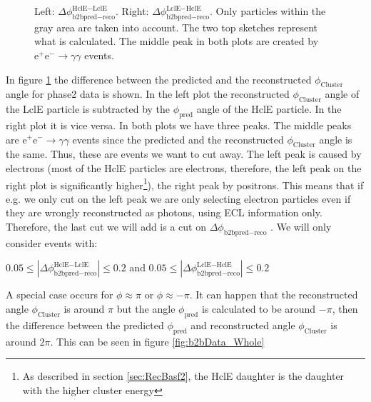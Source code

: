 \documentclass[a4paper,11pt,twosided,final,german,openbib,pdftex,listof=totoc,bibliography=totoc]{scrbook}
\begin{document}
\begin{figure}[h!]
\begin{minipage}[b]{\textwidth}
	\caption[b2bClusterPhi - clusterPhi For Phase2 Data]{Left: $\Delta \phi _{\textrm{b2bpred} - \textrm{reco}}^{\textrm{HclE}-\textrm{LclE}}$. Right:  $\Delta \phi _{\textrm{b2bpred} - \textrm{reco}}^{\textrm{LclE}-\textrm{HclE}}$. Only particles within the gray area are taken into account. The two top sketches represent what is calculated. The middle peak in both plots are created by $\textrm{e}^+\textrm{e}^- \rightarrow \gamma \gamma$ events.}
	\label{fig:b2bData}

\end{minipage}
\end{figure}


In figure \ref{fig:b2bData} the difference between the predicted and the reconstructed $\phi_{\textrm{Cluster}}$ angle for phase2 data is shown. In the left plot the reconstructed $\phi_{\textrm{Cluster}}$ angle of the LclE particle is subtracted by the  $\phi_{\textrm{pred}}$  angle of the HclE particle. In the right plot it is vice versa. In both plots we have three peaks. The middle peaks are $\textrm{e}^+ \textrm{e}^- \rightarrow \gamma \gamma$ events since the predicted and the reconstructed $\phi_{\textrm{Cluster}}$ angle is the same. Thus, these are events we want to cut away. The left peak is caused by electrons (most of the HclE particles are electrons, therefore, the left peak on the right plot is significantly higher\footnote{As described in section \ref{sec:RecBasf2}, the HclE daughter is the daughter with the higher cluster energy}), the right peak by positrons. This means that if e.g. we only cut on the left peak we are only selecting electron particles even if they are wrongly reconstructed as photons, using ECL information only. 
Therefore, the last cut we will add is a cut on $\Delta \phi _{\textrm{b2bpred} - \textrm{reco}}$ . We will only consider events with:
\newline













 $0.05 \leq |\Delta \phi _{\textrm{b2bpred} - \textrm{reco}}^{\textrm{HclE}-\textrm{LclE}}| \leq 0.2 $ and  $0.05 \leq |\Delta \phi _{\textrm{b2bpred} - \textrm{reco}}^{\textrm{LclE}-\textrm{HclE}}| \leq 0.2$
\newline


A special case occurs for $\phi \approx \pi$ or $\phi \approx -\pi$. It can happen that the reconstructed angle $\phi_{\textrm{Cluster}}$ is around $\pi$ but the angle $\phi_{\textrm{pred}}$ is calculated to be around $-\pi$, then the difference between the predicted $\phi_{\textrm{pred}}$ and reconstructed angle $\phi_{\textrm{Cluster}}$ is around $2\pi$. This can be seen in figure \ref{fig:b2bData_Whole}
\end{document}
